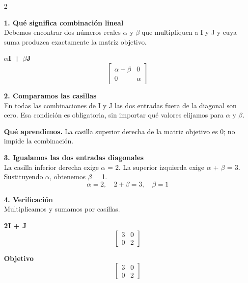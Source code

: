\documentclass[11pt,a4paper,landscape]{article}
\begin{document}
\begin{multicols*}{2}
\noindent\begin{minipage}{\linewidth}\textbf{1. Qué significa combinación lineal}\\[2pt]Debemos encontrar dos números reales $\alpha$ y $\beta$ que multipliquen a I y J y cuya suma produzca exactamente la matriz objetivo.
\par\smallskip \textbf{$\alpha$I + $\beta$J}\[\begin{bmatrix}\alpha + \beta & 0\\0 & \alpha\end{bmatrix}\]
\end{minipage}\par\medskip
\noindent\begin{minipage}{\linewidth}\textbf{2. Comparamos las casillas}\\[2pt]En todas las combinaciones de I y J las dos entradas fuera de la diagonal son cero. Esa condición es obligatoria, sin importar qué valores elijamos para $\alpha$ y $\beta$.
\par\smallskip\textbf{Qué aprendimos.} La casilla superior derecha de la matriz objetivo es 0; no impide la combinación.
\end{minipage}\par\medskip
\noindent\begin{minipage}{\linewidth}\textbf{3. Igualamos las dos entradas diagonales}\\[2pt]La casilla inferior derecha exige $\alpha$ = 2. La superior izquierda exige $\alpha$ + $\beta$ = 3. Sustituyendo $\alpha$, obtenemos $\beta$ = 1.
\[\alpha=2,\quad 2+\beta=3,\quad\beta=1\]
\end{minipage}\par\medskip
\noindent\begin{minipage}{\linewidth}\textbf{4. Verificación}\\[2pt]Multiplicamos y sumamos por casillas.
\par\smallskip \begin{minipage}[t]{.47\linewidth}\centering \textbf{2I + J}\[\begin{bmatrix}3 & 0\\0 & 2\end{bmatrix}\]\end{minipage}\hfill\begin{minipage}[t]{.47\linewidth}\centering \textbf{Objetivo}\[\begin{bmatrix}3 & 0\\0 & 2\end{bmatrix}\]\end{minipage}\par\smallskip

\end{minipage}
\end{multicols*}
\end{document}
